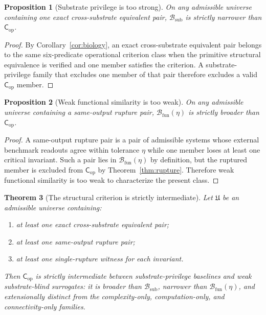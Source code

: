 \documentclass[11pt,a4paper]{article}
\newtheorem{theorem}{Theorem}[section]
\newtheorem{proposition}[theorem]{Proposition}
\theoremstyle{definition}
\newcommand{\Cop}{\mathsf{C}_{\mathrm{op}}}
\begin{document}
\begin{proposition}[Substrate privilege is too strong]\label{prop:substrate-strong}
On any admissible universe containing one exact cross-substrate equivalent pair, $\mathcal{B}_{\mathrm{sub}}$ is strictly narrower than $\Cop$.
\end{proposition}

\begin{proof}
By Corollary~\ref{cor:biology}, an exact cross-substrate equivalent pair belongs to the same six-predicate operational criterion class when the primitive structural equivalence is verified and one member satisfies the criterion. A substrate-privilege family that excludes one member of that pair therefore excludes a valid $\Cop$ member.
\end{proof}

\begin{proposition}[Weak functional similarity is too weak]\label{prop:functional-weak}
On any admissible universe containing a same-output rupture pair, $\mathcal{B}_{\mathrm{fun}}(\eta)$ is strictly broader than $\Cop$.
\end{proposition}

\begin{proof}
A same-output rupture pair is a pair of admissible systems whose external benchmark readouts agree within tolerance $\eta$ while one member loses at least one critical invariant. Such a pair lies in $\mathcal{B}_{\mathrm{fun}}(\eta)$ by definition, but the ruptured member is excluded from $\Cop$ by Theorem~\ref{thm:rupture}. Therefore weak functional similarity is too weak to characterize the present class.
\end{proof}

\begin{theorem}[The structural criterion is strictly intermediate]\label{thm:intermediate}
Let $\mathfrak{U}$ be an admissible universe containing:
\begin{enumerate}[leftmargin=1.5em]
\item at least one exact cross-substrate equivalent pair;
\item at least one same-output rupture pair;
\item at least one single-rupture witness for each invariant.
\end{enumerate}
Then $\Cop$ is strictly intermediate between substrate-privilege baselines and weak substrate-blind surrogates: it is broader than $\mathcal{B}_{\mathrm{sub}}$, narrower than $\mathcal{B}_{\mathrm{fun}}(\eta)$, and extensionally distinct from the complexity-only, computation-only, and connectivity-only families.
\end{theorem}
\end{document}
